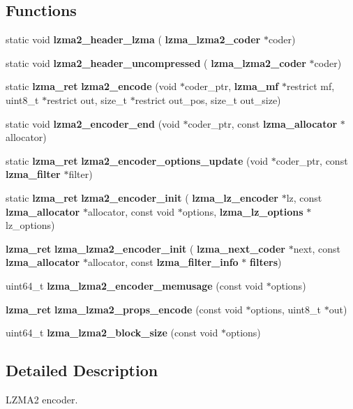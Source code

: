 \subsection*{Functions}
\begin{DoxyCompactItemize}
\item 
\mbox{\label{lzma2__encoder_8c_a72ddcbae0ec246fc03433e24667195dd}} 
static void {\bfseries lzma2\+\_\+header\+\_\+lzma} (\textbf{ lzma\+\_\+lzma2\+\_\+coder} $\ast$coder)
\item 
\mbox{\label{lzma2__encoder_8c_ad60d7b0e3567a5c8131eeaa2e3989e3c}} 
static void {\bfseries lzma2\+\_\+header\+\_\+uncompressed} (\textbf{ lzma\+\_\+lzma2\+\_\+coder} $\ast$coder)
\item 
\mbox{\label{lzma2__encoder_8c_ad7765e6e70b2e709e53983abc2f44395}} 
static \textbf{ lzma\+\_\+ret} {\bfseries lzma2\+\_\+encode} (void $\ast$coder\+\_\+ptr, \textbf{ lzma\+\_\+mf} $\ast$restrict mf, uint8\+\_\+t $\ast$restrict out, size\+\_\+t $\ast$restrict out\+\_\+pos, size\+\_\+t out\+\_\+size)
\item 
\mbox{\label{lzma2__encoder_8c_a2da79833932d1170803d3d42d41c2212}} 
static void {\bfseries lzma2\+\_\+encoder\+\_\+end} (void $\ast$coder\+\_\+ptr, const \textbf{ lzma\+\_\+allocator} $\ast$allocator)
\item 
\mbox{\label{lzma2__encoder_8c_a1fdfc1236d28d956ecd731bbb3af3630}} 
static \textbf{ lzma\+\_\+ret} {\bfseries lzma2\+\_\+encoder\+\_\+options\+\_\+update} (void $\ast$coder\+\_\+ptr, const \textbf{ lzma\+\_\+filter} $\ast$filter)
\item 
\mbox{\label{lzma2__encoder_8c_a48343e34cdbc1a70fef131b3c05e99df}} 
static \textbf{ lzma\+\_\+ret} {\bfseries lzma2\+\_\+encoder\+\_\+init} (\textbf{ lzma\+\_\+lz\+\_\+encoder} $\ast$lz, const \textbf{ lzma\+\_\+allocator} $\ast$allocator, const void $\ast$options, \textbf{ lzma\+\_\+lz\+\_\+options} $\ast$lz\+\_\+options)
\item 
\mbox{\label{lzma2__encoder_8c_a7dd1146ceea09c352e705de30d14aace}} 
\textbf{ lzma\+\_\+ret} {\bfseries lzma\+\_\+lzma2\+\_\+encoder\+\_\+init} (\textbf{ lzma\+\_\+next\+\_\+coder} $\ast$next, const \textbf{ lzma\+\_\+allocator} $\ast$allocator, const \textbf{ lzma\+\_\+filter\+\_\+info} $\ast$\textbf{ filters})
\item 
\mbox{\label{lzma2__encoder_8c_afff5740f7004ed7d3c7b67c3671a30c0}} 
uint64\+\_\+t {\bfseries lzma\+\_\+lzma2\+\_\+encoder\+\_\+memusage} (const void $\ast$options)
\item 
\mbox{\label{lzma2__encoder_8c_aecbff0af1269d11accb87f956e2609d4}} 
\textbf{ lzma\+\_\+ret} {\bfseries lzma\+\_\+lzma2\+\_\+props\+\_\+encode} (const void $\ast$options, uint8\+\_\+t $\ast$out)
\item 
\mbox{\label{lzma2__encoder_8c_ae1c48f80b363367e094795c60f466624}} 
uint64\+\_\+t {\bfseries lzma\+\_\+lzma2\+\_\+block\+\_\+size} (const void $\ast$options)
\end{DoxyCompactItemize}


\subsection{Detailed Description}
L\+Z\+M\+A2 encoder. 

